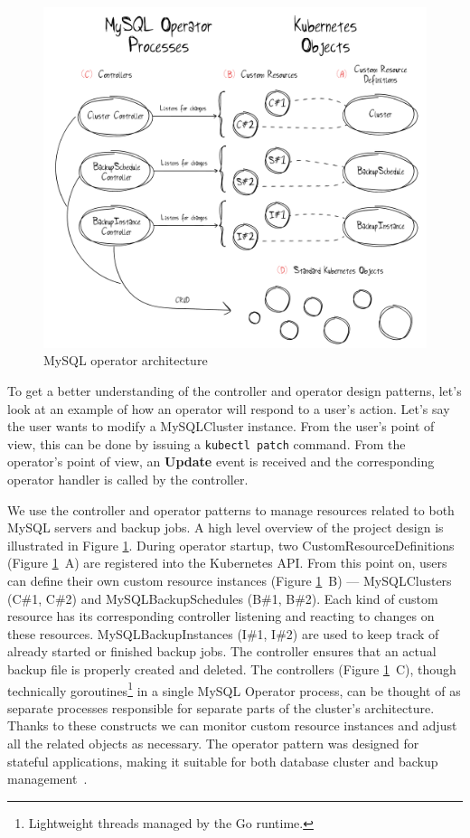 \begin{figure}[!ht]
    \centering
    \includegraphics[width=1\textwidth, angle=0]{img/Design.pdf}
    \caption{MySQL operator architecture}
    \label{fig:design}
\end{figure}

To get a better understanding of the controller and operator design patterns, let’s look at an
example of how an operator will respond to a user’s action. Let’s say the user wants to modify a
MySQLCluster instance. From the user’s point of view, this can be done by issuing a
\texttt{kubectl patch} command. From the operator’s point of view, an \textbf{Update} event is
received and the corresponding operator handler is called by the controller.

We use the controller and operator patterns to manage resources related to both
MySQL servers and backup jobs. A high level overview of the project design is
illustrated in Figure \ref{fig:design}. During operator startup, two
CustomResourceDefinitions (Figure \ref{fig:design}~A) are registered into the Kubernetes API.
From this point on, users can define their own custom resource instances (Figure \ref{fig:design}~B) ---
MySQLClusters (C\#1, C\#2) and MySQLBackupSchedules (B\#1, B\#2). Each kind of
custom resource has its corresponding controller listening and reacting to changes on these
resources. MySQLBackupInstances (I\#1, I\#2) are used to keep track of already started or finished backup jobs.
The controller ensures that an actual backup file is properly created and deleted.
The controllers (Figure \ref{fig:design}~C), though technically
goroutines\footnote{Lightweight threads managed by the Go runtime.} in a single
MySQL Operator process, can be thought of as separate processes responsible for separate parts of the
cluster’s architecture. Thanks to these constructs we can monitor custom resource instances and adjust
all the related objects as necessary. The operator pattern was designed for stateful applications, making
it suitable for both database cluster and backup management~\cite{coreos}.

